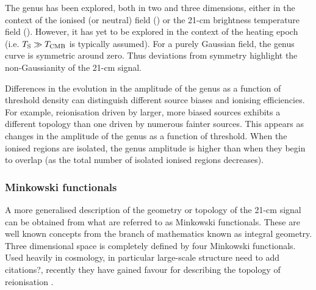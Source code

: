 The genus has been explored, both in two and three dimensions, either in the context of the ionised (or neutral) field (\cite{Gleser:2006,Lee:2008,Friedrich:2011}) or the 21-cm brightness temperature field (\cite{Hong:2014,Wang:2015}). However, it has yet to be explored in the context of the heating epoch (i.e. $T_{\rm S} \gg T_{\rm CMB}$ is typically assumed). For a purely Gaussian field, the genus curve is symmetric around zero. Thus deviations from symmetry highlight the non-Gaussianity of the 21-cm signal. 

Differences in the evolution in the amplitude of the genus as a function of threshold density can distinguish different source biases and ionising efficiencies. For example, reionisation driven by larger, more biased sources exhibits a different topology than one driven by numerous fainter sources. This appears as changes in the amplitude of the genus as a function of threshold. When the ionised regions are isolated, the genus amplitude is higher than when they begin to overlap (as the total number of isolated ionised regions decreases).

\subsubsection{Minkowski functionals}

A more generalised description of the geometry or topology of the 21-cm signal can be obtained from what are referred to as Minkowski functionals. These are well known concepts from the branch of mathematics known as integral geometry. Three dimensional space is completely defined by four Minkowski functionals. Used heavily in cosmology, in particular large-scale structure {\color{red} need to add citations?}, recently they have gained favour for describing the topology of reionisation \cite{Gleser:2006,Friedrich:2011,Yoshiura:2017,Chen:2018}.

